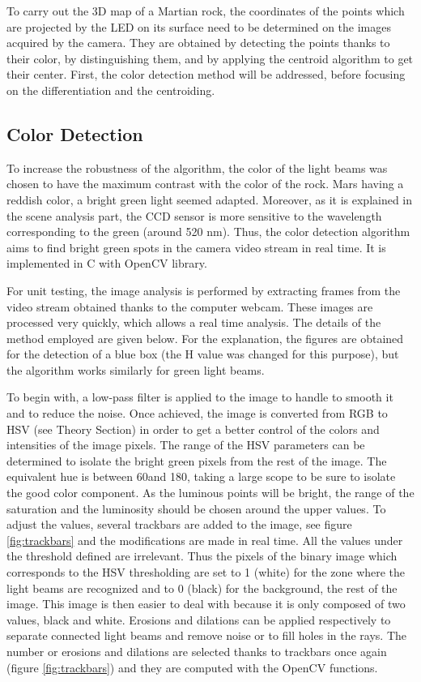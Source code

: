 To carry out the 3D map of a Martian rock, the coordinates of the points which are projected by the LED on its surface need to be determined on the images acquired by the camera. They are obtained by detecting the points thanks to their color, by distinguishing them, and by applying the centroid algorithm to get their center. First, the color detection method will be addressed, before focusing on the differentiation and the centroiding.

\subsection{Color Detection}

To increase the robustness of the algorithm, the color of the light beams was chosen to have the maximum contrast with the color of the rock. Mars having a reddish color, a bright green light seemed adapted. Moreover, as it is explained in the scene analysis part, the CCD sensor is more sensitive to the wavelength corresponding to the green (around 520 nm). Thus, the color detection algorithm aims to find bright green spots in the camera video stream in real time. It is implemented in C with OpenCV library. 

For unit testing, the image analysis is performed by extracting frames from the video stream obtained thanks to the computer webcam. These images are processed very quickly, which allows a real time analysis. The details of the method employed are given below. For the explanation, the figures are obtained for the detection of a blue box (the H value was changed for this purpose), but the algorithm works similarly for green light beams.

To begin with, a low-pass filter is applied to the image to handle to smooth it and to reduce the noise. Once achieved, the image is converted from RGB to HSV (see Theory Section) in order to get a better control of the colors and intensities of the image pixels. The range of the HSV parameters can be determined to isolate the bright green pixels from the rest of the image. The equivalent hue is between 60\degree  and 180\degree, taking a large scope to be sure to isolate the good color component. As the luminous points will be bright, the range of the saturation and the luminosity should be chosen around the upper values. To adjust the values, several trackbars are added to the image, see figure \ref{fig:trackbars} and the modifications are made in real time. All the values under the threshold defined are irrelevant. Thus the pixels of the binary image which corresponds to the HSV thresholding are set to 1 (white) for the zone where the light beams are recognized and to 0 (black) for the background, the rest of the image. This image is then easier to deal with because it is only composed of two values, black and white. Erosions and dilations can be applied respectively to separate connected light beams and remove noise or to fill holes in the rays. The number or erosions and dilations are selected thanks to trackbars once again (figure \ref{fig:trackbars}) and they are computed with the OpenCV functions. 


